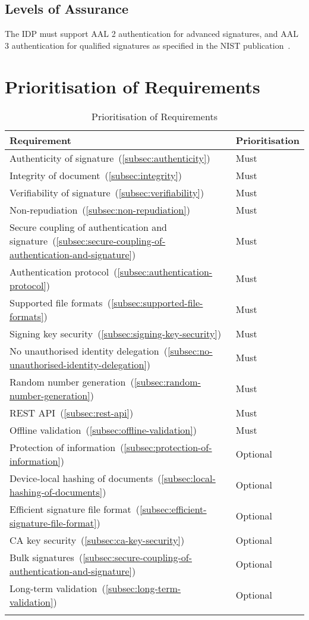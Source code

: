 \subsection{Levels of Assurance}\label{subsec:levels-of-assurance}
The \gls{IDP} must support \gls{AAL} 2 authentication for advanced signatures, and \gls{AAL} 3 authentication for qualified signatures as specified in the \gls{NIST} publication~\cite{nistdigitalidentityguidelines}.

\section{Prioritisation of Requirements}
\label{sec:prioritisation}
\begin{longtable}{p{12cm}|p{2.5cm}}
    \textbf{Requirement} & \textbf{Prioritisation}\\
    \hline
    Authenticity of signature~(\ref{subsec:authenticity}) & Must\\
    Integrity of document~(\ref{subsec:integrity}) & Must\\
    Verifiability of signature~(\ref{subsec:verifiability}) & Must\\
    Non-repudiation~(\ref{subsec:non-repudiation}) & Must\\
    Secure coupling of authentication and signature~(\ref{subsec:secure-coupling-of-authentication-and-signature}) & Must\\
    Authentication protocol~(\ref{subsec:authentication-protocol}) & Must\\
    Supported file formats~(\ref{subsec:supported-file-formats}) & Must\\
    Signing key security~(\ref{subsec:signing-key-security}) & Must\\
    No unauthorised identity delegation~(\ref{subsec:no-unauthorised-identity-delegation}) & Must\\
    Random number generation~(\ref{subsec:random-number-generation}) & Must\\
    \gls{REST} \gls{API}~(\ref{subsec:rest-api}) & Must\\
    Offline validation~(\ref{subsec:offline-validation}) & Must\\
    Protection of information~(\ref{subsec:protection-of-information}) & Optional\\
    Device-local hashing of documents~(\ref{subsec:local-hashing-of-documents}) & Optional\\
    Efficient signature file format~(\ref{subsec:efficient-signature-file-format}) & Optional\\
    \gls{CA} key security~(\ref{subsec:ca-key-security}) & Optional\\
    Bulk signatures~(\ref{subsec:secure-coupling-of-authentication-and-signature}) & Optional\\
    Long-term validation~(\ref{subsec:long-term-validation}) & Optional\\
    \caption{Prioritisation of Requirements}
\end{longtable}
